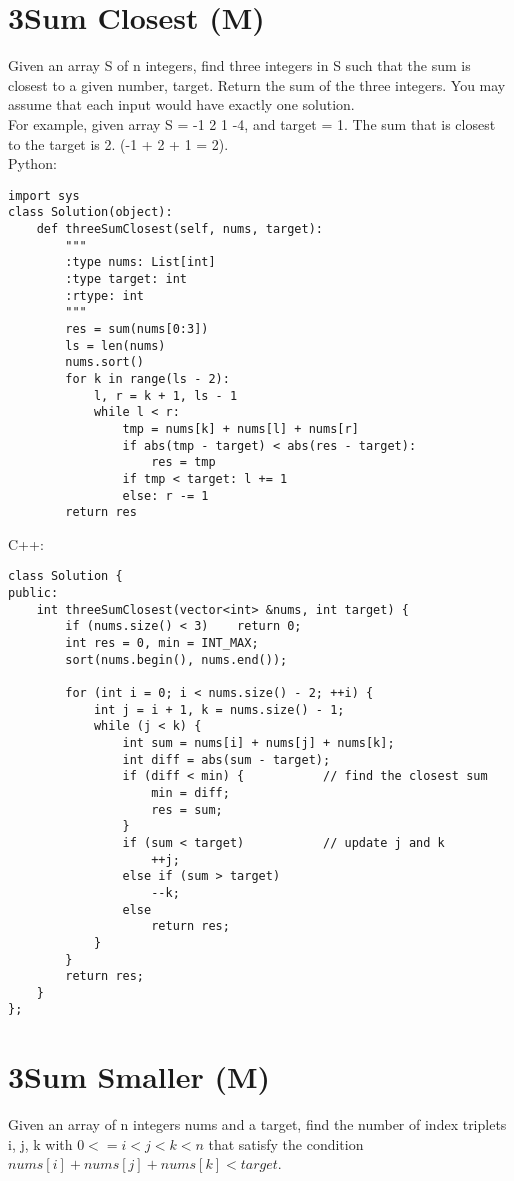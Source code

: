 \section{3Sum Closest (M)}
Given an array S of n integers, find three integers in S such that the sum is closest to a given number, target. Return the sum of the three integers. You may assume that each input would have exactly one solution. \\

For example, given array S = {-1 2 1 -4}, and target = 1. The sum that is closest to the target is 2. (-1 + 2 + 1 = 2).\\

Python:
\lstset{language=python}
\begin{lstlisting}
import sys
class Solution(object):
    def threeSumClosest(self, nums, target):
        """
        :type nums: List[int]
        :type target: int
        :rtype: int
        """
        res = sum(nums[0:3])
        ls = len(nums)
        nums.sort()
        for k in range(ls - 2):
            l, r = k + 1, ls - 1
            while l < r:
                tmp = nums[k] + nums[l] + nums[r]
                if abs(tmp - target) < abs(res - target):
                    res = tmp
                if tmp < target: l += 1
                else: r -= 1
        return res
\end{lstlisting}

C++:
\lstset{language=C++}
\begin{lstlisting}
class Solution {
public:
    int threeSumClosest(vector<int> &nums, int target) {
        if (nums.size() < 3)    return 0;
        int res = 0, min = INT_MAX;
        sort(nums.begin(), nums.end());
        
        for (int i = 0; i < nums.size() - 2; ++i) {
            int j = i + 1, k = nums.size() - 1;
            while (j < k) {
                int sum = nums[i] + nums[j] + nums[k];
                int diff = abs(sum - target);
                if (diff < min) {           // find the closest sum
                    min = diff;
                    res = sum;
                }
                if (sum < target)           // update j and k
                    ++j;
                else if (sum > target)
                    --k;
                else
                    return res;
            }
        }
        return res;
    }
};
\end{lstlisting}


\section{3Sum Smaller (M)}
Given an array of n integers nums and a target, find the number of index triplets i, j, k with $0 <= i < j < k < n$ that satisfy the condition $nums[i] + nums[j] + nums[k] < target$.\\

